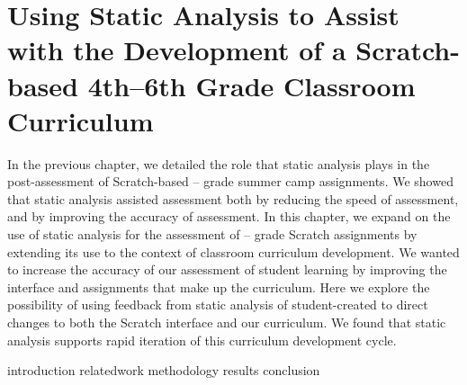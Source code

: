 \chapter{Using Static Analysis to Assist with the Development of a
  Scratch-based 4th--6th Grade Classroom Curriculum}
\label{chap:curriculum}

\def\currentprefix{curriculum}

In the previous chapter, we detailed the role that static analysis plays in the
post-assessment of Scratch-based -- grade summer camp
assignments. We showed that static analysis assisted assessment both by
reducing the speed of assessment, and by improving the accuracy of
assessment. In this chapter, we expand on the use of static analysis for the
assessment of -- grade Scratch assignments by extending its use
to the context of classroom curriculum development. We wanted to increase the
accuracy of our assessment of student learning by improving the interface and
assignments that make up the curriculum. Here we explore the possibility of
using feedback from static analysis of student-created  to direct
changes to both the Scratch interface and our curriculum. We found that static
analysis supports rapid iteration of this curriculum development cycle.

{introduction}
{relatedwork}
{methodology}
{results}
{conclusion}
